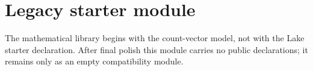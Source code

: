 \chapter{Legacy starter module}

The mathematical library begins with the count-vector model, not with the
Lake starter declaration.  After final polish this module carries no public
declarations; it remains only as an empty compatibility module.
